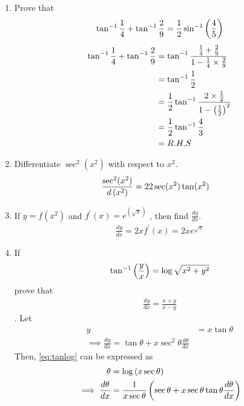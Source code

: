 \documentclass[journal,12pt,twocolumn]{IEEEtran}
\renewcommand\thesection{\arabic{section}}
\begin{document}
\begin{enumerate}[label=\thesection.\arabic*.,ref=\thesection.\theenumi]
		 

    
\item Prove that \begin{align} \tan^{-1} \frac{1}{4} + \tan^{-1} \frac{2}{9} = \frac{1}{2} \sin^{-1} \left(\frac{4}{5}\right) \nonumber \end{align}
		\solution 
		\begin{align} \tan^{-1} \frac{1}{4} + \tan^{-1} \frac{2}{9} &= \tan^{-1}\frac{\frac{1}{4}+\frac{2}{9}}{1-\frac{1}{4}\times \frac{2}{9}}
			\\
			&= \tan^{-1}\frac{1}{2}
			\\
			&= \frac{1}{2}\tan^{-1}\frac{2 \times \frac{1}{2}}{1-\left(\frac{1}{2}\right)^2}
			\\
			&= \frac{1}{2}\tan^{-1}\frac{4}{3}
			\\
			&= R.H.S
 \end{align}
 \item Differentiate $ \sec^2(x^2) $ with respect to $ x^2 $.
	 \\
	 \solution 
\begin{align} 
	\frac{\sec^2(x^2) }{d\left(x^2\right)} &=2 2 \sec(x^2) \tan(x^2)  
\end{align}
 \item If $y=f(x^2)$  and  $f^{\prime}(x)=  e^{\left(\sqrt{x}\right)}$  , then find $\frac{dy}{dx}$.\\
	 \solution 
\begin{align} 
	\frac{dy}{dx} = 2x f^{\prime}(x) = 2x e^{\sqrt{x}}
\end{align}
\item If \begin{align} \tan^{-1}\left(\frac{y}{x}\right)=\log \sqrt{x^2+y^2} \nonumber \end{align}  prove that \begin{align} \frac{dy}{dx}=\frac{x+y}{x-y} \label{eq:tanlog}\end{align}.
		\solution Let 
		\begin{align}
			y &= x \tan \theta 
			\\
			\implies \frac{dy}{dx} = \tan \theta + x \sec^2 \theta \frac{d\theta}{dx}
\label{eq:tanlog_1}
		\end{align}
		Then, \eqref{eq:tanlog} can be expressed as 
		\begin{align}
			\theta  &= \log \brak{x \sec \theta}
			\\
			\implies \frac{d\theta}{dx} &= \frac{1}{{x \sec \theta}}\brak{\sec \theta + x \sec \theta \tan \theta \frac{d\theta}{dx}}
			\\

\end{align}
\end{enumerate}
\end{document}
